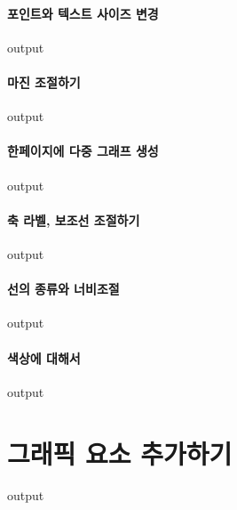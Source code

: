 \documentclass{book}
\begin{document}
\paragraph{포인트와 텍스트 사이즈 변경}
\begin{Schunk}
\begin{Soutput}
output
\end{Soutput}
\end{Schunk}
\paragraph{마진 조절하기}
\begin{Schunk}
\begin{Soutput}
output
\end{Soutput}
\end{Schunk}
\paragraph{한페이지에 다중 그래프 생성}
\begin{Schunk}
\begin{Soutput}
output
\end{Soutput}
\end{Schunk}
\paragraph{축 라벨, 보조선 조절하기}
\begin{Schunk}
\begin{Soutput}
output
\end{Soutput}
\end{Schunk}
\paragraph{선의 종류와 너비조절}
\begin{Schunk}
\begin{Soutput}
output
\end{Soutput}
\end{Schunk}
\paragraph{색상에 대해서}
\begin{Schunk}
\begin{Soutput}
output
\end{Soutput}
\end{Schunk}


\section{그래픽 요소 추가하기}
\begin{Schunk}
\begin{Soutput}
output
\end{Soutput}
\end{Schunk}
\end{document}
